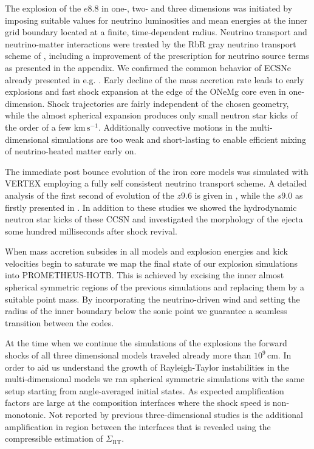 \documentclass[fleqn,usenatbib]{mnras}
\newcommand{\kms}{\ensuremath{\mathrm{km\, s^{-1}}}\xspace}
\newcommand{\prom}{\textsc{P{\footnotesize ROMETHEUS}-H{\footnotesize OT}B}\xspace}
\newcommand{\vertex}{\textsc{V{\footnotesize ERTEX}}\xspace}
\begin{document}
The explosion of the $e8.8$ in one-, two- and three dimensions was initiated by imposing suitable values for neutrino luminosities and mean energies at the inner grid boundary located at a finite, time-dependent radius. Neutrino transport and neutrino-matter interactions were treated by the RbR gray neutrino transport scheme of \citet{Scheck2006}, including a improvement of the prescription for neutrino source terms as presented in the appendix. We confirmed the common behavior of ECSNe already presented in e.g. \citet{Kitaura2006,Gessner2018}. Early decline of the mass accretion rate leads to early explosions and fast shock expansion at the edge of the ONeMg core even in one-dimension. Shock trajectories are fairly independent of the chosen geometry, while the almost spherical expansion produces only small neutron star kicks of the order of a few \kms. Additionally convective motions in the multi-dimensional simulations are too weak and short-lasting to enable efficient mixing of neutrino-heated matter early on.

The immediate post bounce evolution of the iron core models was simulated with \vertex employing a fully self consistent neutrino transport scheme. A detailed analysis of the first second of evolution of the $z9.6$ is given in \citet{Melson2015a}, while the $s9.0$ as firstly presented in \citet{Melson2019}. 
In addition to these studies we showed the hydrodynamic neutron star kicks of these CCSN and investigated the morphology of the ejecta some hundred milliseconds after shock revival. 

When mass accretion subsides in all models and explosion energies and kick velocities begin to saturate we map the final state of our explosion simulations into \prom. This is achieved by excising the inner almost spherical symmetric regions of the previous simulations and replacing them by a suitable point mass. By incorporating the neutrino-driven wind and setting the radius of the inner boundary below the sonic point we guarantee a seamless transition between the codes.

At the time when we continue the simulations of the explosions the forward shocks of all three dimensional models traveled already more than $10^9\,\mathrm{cm}$. 
In order to aid us understand the growth of Rayleigh-Taylor instabilities in the multi-dimensional models we ran spherical symmetric simulations with the same setup starting from angle-averaged initial states. As expected amplification factors are large at the composition interfaces where the shock speed is non-monotonic. Not reported by previous three-dimensional studies is the additional amplification in region between the interfaces that is revealed using the compressible estimation of $\Sigma_{\mathrm{RT}}$.
\end{document}
